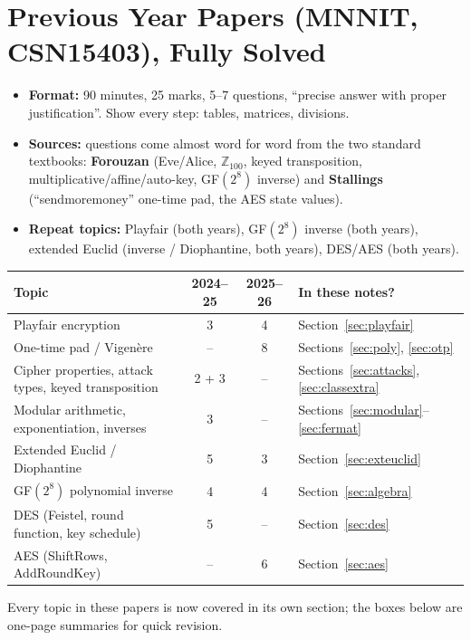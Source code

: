 \clearpage
\section{Previous Year Papers (MNNIT, CSN15403), Fully Solved}\label{sec:pastpapers}

\begin{keybox}[title=What these papers tell you]
\begin{itemize}
  \item \textbf{Format:} 90 minutes, 25 marks, 5--7 questions, ``precise answer with proper justification''. Show every step: tables, matrices, divisions.
  \item \textbf{Sources:} questions come almost word for word from the two standard textbooks: \textbf{Forouzan} (Eve/Alice, $\mathbb{Z}_{100}$, keyed transposition, multiplicative/affine/auto-key, GF$(2^8)$ inverse) and \textbf{Stallings} (``sendmoremoney'' one-time pad, the AES state values).
  \item \textbf{Repeat topics:} Playfair (both years), GF$(2^8)$ inverse (both years), extended Euclid (inverse / Diophantine, both years), DES/AES (both years).
\end{itemize}
\end{keybox}
\begin{center}\small
\begin{tabularx}{\textwidth}{@{}l c c X@{}}
\toprule
Topic & 2024--25 & 2025--26 & In these notes?\\
\midrule
Playfair encryption & 3 & 4 & Section~\ref{sec:playfair}\\
One-time pad / Vigen\`ere & -- & 8 & Sections~\ref{sec:poly}, \ref{sec:otp}\\
Cipher properties, attack types, keyed transposition & 2 + 3 & -- & Sections~\ref{sec:attacks}, \ref{sec:classextra}\\
Modular arithmetic, exponentiation, inverses & 3 & -- & Sections~\ref{sec:modular}--\ref{sec:fermat}\\
Extended Euclid / Diophantine & 5 & 3 & Section~\ref{sec:exteuclid}\\
GF$(2^8)$ polynomial inverse & 4 & 4 & Section~\ref{sec:algebra}\\
DES (Feistel, round function, key schedule) & 5 & -- & Section~\ref{sec:des}\\
AES (ShiftRows, AddRoundKey) & -- & 6 & Section~\ref{sec:aes}\\
\bottomrule
\end{tabularx}
\end{center}
Every topic in these papers is now covered in its own section; the boxes below are one-page summaries for quick revision.

